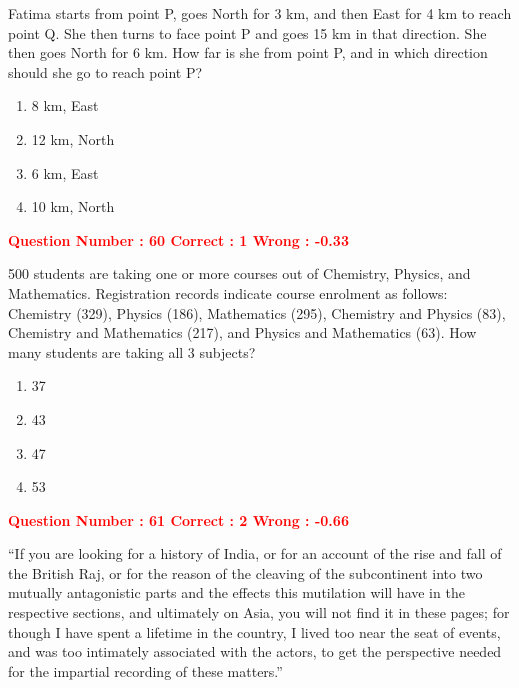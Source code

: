 \documentclass[12pt]{article}
\begin{document}
{Fatima starts from point P, goes North for 3 km, and then East for 4 km to reach point Q. She then turns to face point P and goes 15 km in that direction. She then goes North for 6 km. How far is she from point P, and in which direction should she go to reach point P?

\begin{enumerate}[label=(\Alph*)]
    \item 8 km, East
    \item 12 km, North
    \item 6 km, East
    \item 10 km, North
\end{enumerate}

\vspace{1em}


\textcolor{red}{\textbf{Question Number : 60 \hfill Correct : 1  Wrong : -0.33}}

\vspace{0.5em}

500 students are taking one or more courses out of Chemistry, Physics, and Mathematics. Registration records indicate course enrolment as follows: Chemistry (329), Physics (186), Mathematics (295), Chemistry and Physics (83), Chemistry and Mathematics (217), and Physics and Mathematics (63). How many students are taking all 3 subjects?

\begin{enumerate}[label=(\Alph*)]
    \item 37
    \item 43
    \item 47
    \item 53
\end{enumerate}

\textcolor{red}{\textbf{Question Number : 61 \hfill Correct : 2  Wrong : -0.66}}

\vspace{0.5em}

``If you are looking for a history of India, or for an account of the rise and fall of the British Raj, or for the reason of the cleaving of the subcontinent into two mutually antagonistic parts and the effects this mutilation will have in the respective sections, and ultimately on Asia, you will not find it in these pages; for though I have spent a lifetime in the country, I lived too near the seat of events, and was too intimately associated with the actors, to get the perspective needed for the impartial recording of these matters.''

}
\end{document}
